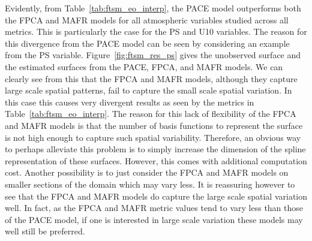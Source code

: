 Evidently, from Table~\ref{tab:ftsm_eo_interp}, the PACE model outperforms both the FPCA and MAFR models for all atmospheric variables studied across all metrics.
This is particularly the case for the PS and U10 variables. 
The reason for this divergence from the PACE model can be seen by considering an example from the PS variable.
Figure~\ref{fig:ftsm_res_ps} gives the unobserved surface and the estimated surfaces from the PACE, FPCA, and MAFR models.
We can clearly see from this that the FPCA and MAFR models, although they capture large scale spatial patterns, fail to capture the small scale spatial variation.
In this case this causes very divergent results as seen by the metrics in Table~\ref{tab:ftsm_eo_interp}. 
The reason for this lack of flexibility of the FPCA and MAFR models is that the number of basis functions to represent the surface is not high enough to capture such spatial variability. 
Therefore, an obvious way to perhaps alleviate this problem is to simply increase the dimension of the spline representation of these surfaces. 
However, this comes with additional computation cost.
Another possibility is to just consider the FPCA and MAFR models on smaller sections of the domain which may vary less.
It is reassuring however to see that the FPCA and MAFR models do capture the large scale spatial variation well.
In fact, as the FPCA and MAFR metric values tend to vary less than those of the PACE model, if one is interested in large scale variation these models may well still be preferred.

